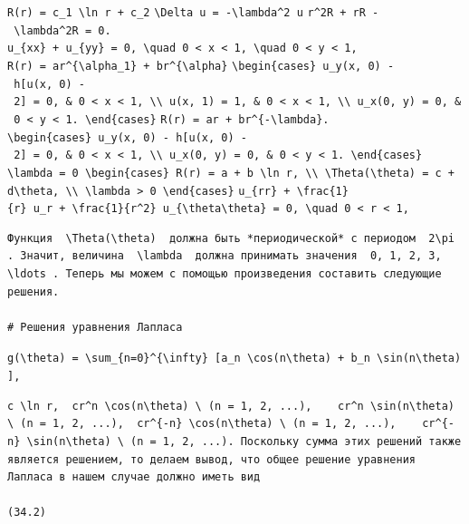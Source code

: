\documentclass[
  ukrainian,
]{article}
\begin{document}
\texttt{R(r)\ =\ c\_1\ \textbackslash{}ln\ r\ +\ c\_2}
\texttt{\textbackslash{}Delta\ u\ =\ -\textbackslash{}lambda\^{}2\ u}
\texttt{r\^{}2R\textquotesingle{}\textquotesingle{}\ +\ rR\textquotesingle{}\ -\ \textbackslash{}lambda\^{}2R\ =\ 0.}
\texttt{u\_\{xx\}\ +\ u\_\{yy\}\ =\ 0,\ \textbackslash{}quad\ 0\ \textless{}\ x\ \textless{}\ 1,\ \textbackslash{}quad\ 0\ \textless{}\ y\ \textless{}\ 1,}
\texttt{R(r)\ =\ ar\^{}\{\textbackslash{}alpha\_1\}\ +\ br\^{}\{\textbackslash{}alpha\}}
\texttt{\textbackslash{}begin\{cases\}\ u\_y(x,\ 0)\ -\ h{[}u(x,\ 0)\ -\ 2{]}\ =\ 0,\ \&\ 0\ \textless{}\ x\ \textless{}\ 1,\ \textbackslash{}\textbackslash{}\ u(x,\ 1)\ =\ 1,\ \&\ 0\ \textless{}\ x\ \textless{}\ 1,\ \textbackslash{}\textbackslash{}\ u\_x(0,\ y)\ =\ 0,\ \&\ 0\ \textless{}\ y\ \textless{}\ 1.\ \textbackslash{}end\{cases\}}
\texttt{R(r)\ =\ ar\textquotesingle{}\ +\ br\^{}\{-\textbackslash{}lambda\}.}
\texttt{\textbackslash{}begin\{cases\}\ u\_y(x,\ 0)\ -\ h{[}u(x,\ 0)\ -\ 2{]}\ =\ 0,\ \&\ 0\ \textless{}\ x\ \textless{}\ 1,\ \textbackslash{}\textbackslash{}\ u\_x(0,\ y)\ =\ 0,\ \&\ 0\ \textless{}\ y\ \textless{}\ 1.\ \textbackslash{}end\{cases\}}
\texttt{\textbackslash{}lambda\ =\ 0\ \textbackslash{}begin\{cases\}\ R(r)\ =\ a\ +\ b\ \textbackslash{}ln\ r,\ \textbackslash{}\textbackslash{}\ \textbackslash{}Theta(\textbackslash{}theta)\ =\ c\ +\ d\textbackslash{}theta,\ \textbackslash{}\textbackslash{}\ \textbackslash{}lambda\ \textgreater{}\ 0\ \textbackslash{}end\{cases\}}
\texttt{u\_\{rr\}\ +\ \textbackslash{}frac\{1\}\{r\}\ u\_r\ +\ \textbackslash{}frac\{1\}\{r\^{}2\}\ u\_\{\textbackslash{}theta\textbackslash{}theta\}\ =\ 0,\ \textbackslash{}quad\ 0\ \textless{}\ r\ \textless{}\ 1,}

\begin{verbatim}
Функция  \Theta(\theta)  должна быть *периодической* с периодом  2\pi . Значит, величина  \lambda  должна принимать значения  0, 1, 2, 3, \ldots . Теперь мы можем с помощью произведения составить следующие решения.

# Решения уравнения Лапласа
\end{verbatim}

\texttt{g(\textbackslash{}theta)\ =\ \textbackslash{}sum\_\{n=0\}\^{}\{\textbackslash{}infty\}\ {[}a\_n\ \textbackslash{}cos(n\textbackslash{}theta)\ +\ b\_n\ \textbackslash{}sin(n\textbackslash{}theta){]},}

\begin{verbatim}
c \ln r,  cr^n \cos(n\theta) \ (n = 1, 2, ...),    cr^n \sin(n\theta) \ (n = 1, 2, ...),  cr^{-n} \cos(n\theta) \ (n = 1, 2, ...),    cr^{-n} \sin(n\theta) \ (n = 1, 2, ...). Поскольку сумма этих решений также является решением, то делаем вывод, что общее решение уравнения Лапласа в нашем случае должно иметь вид

(34.2)
\end{verbatim}
\end{document}

